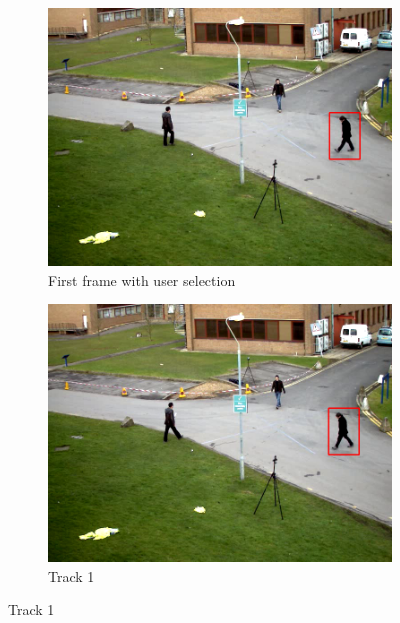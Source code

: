 \documentclass[a4paper,11]{article}
\begin{document}
 \begin{figure}[H]
  \begin{subfigure}{0.5\textwidth}
   \centering
   \includegraphics[width=0.8\linewidth]{first.png}
   \caption{First frame with user selection}
  \end{subfigure}
  \begin{subfigure}{0.5\textwidth}
   \centering
   \includegraphics[width=0.8\linewidth]{track1.png}
   \caption{Track 1}
  \end{subfigure}
  \vspace{1em}
  

\end{figure}
\end{document}
